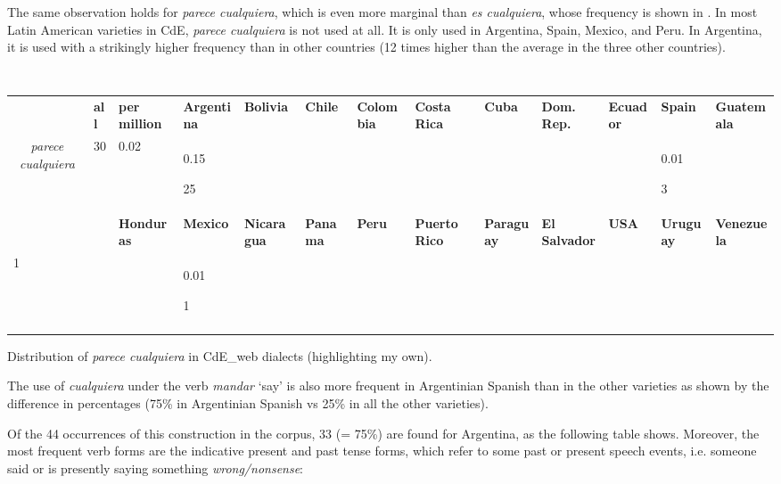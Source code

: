   The same observation holds for \textit{parece cualquiera}, which is even more marginal than \textit{es cualquiera}, whose frequency is shown in . In most Latin American varieties in CdE, \textit{parece cualquiera} is not used at all. It is only used in Argentina, Spain, Mexico, and Peru. In Argentina, it is used with a strikingly higher frequency than in other countries (12 times higher than the average in the three other countries).


\begin{table}
\begin{tabularx}{\textwidth}{XXXXXXXXXXXXX}
\lsptoprule
\multicolumn{1}{c}{\textbf{context}} & \textbf{all} & \textbf{per} \textbf{million} & \textbf{Argentina} & \textbf{Bolivia} & \textbf{Chile} & \textbf{Colombia} & \textbf{Costa} \textbf{Rica} & \textbf{Cuba} & \textbf{Dom.} \textbf{Rep.} & \textbf{Ecuador} & \textbf{Spain} & \textbf{Guatemala}\\
\multicolumn{1}{c}{ \textit{parece cualquiera}} & 30 & 0.02 & { 0.15}

 25 &  &  &  &  &  &  &  & { 0.01}

 3 & \\
&  & \textbf{Honduras} & \textbf{Mexico} & \textbf{Nicaragua} & \textbf{Panama} & \textbf{Peru} & \textbf{Puerto} \textbf{Rico} & \textbf{Paraguay} & \textbf{El} \textbf{Salvador} & \textbf{USA} & \textbf{Uruguay} & \textbf{Venezuela}\\

 1 &  &  & { 0.01}

 1 &  &  &  &  &  & \\
\lspbottomrule
\end{tabularx}
\caption{\label{tab:} ~}Distribution of \textit{parece cualquiera} in CdE\_web dialects (highlighting my own).
\end{table}

The use of \textit{cualquiera} under the verb \textit{mandar} ‘say’ is also more frequent in Argentinian Spanish than in the other varieties as shown by the difference in percentages (75\% in Argentinian Spanish vs 25\% in all the other varieties).

  Of the 44 occurrences of this construction in the corpus, 33 (= 75\%) are found for Argentina, as the following table shows. Moreover, the most frequent verb forms are the indicative present and past tense forms, which refer to some past or present speech events, i.e. someone said or is presently saying something \textit{wrong/nonsense}:


